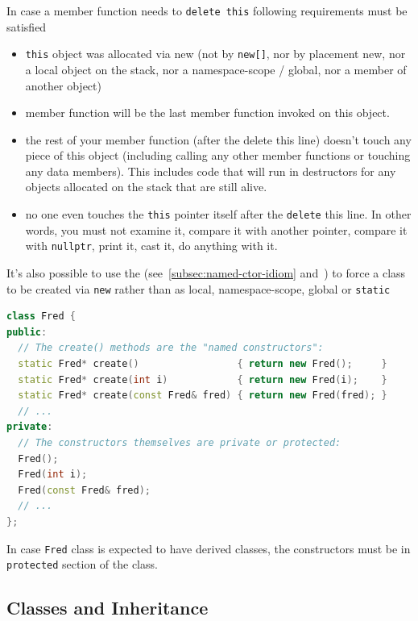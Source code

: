 In case a member function needs to \texttt{delete this} following 
requirements must be satisfied
\begin{itemize}
    \item \texttt{this} object was allocated via new (not by \texttt{new[]}, 
          nor by placement new, nor a local object on the stack, 
          nor a namespace-scope / global, nor a member of another 
          object)
    
    \item member function will be the last member function invoked on 
          this object.
    
    \item the rest of your member function (after the delete this line) 
          doesn’t touch any piece of this object (including calling any 
          other member functions or touching any data members). This 
          includes code that will run in destructors for any objects 
          allocated on the stack that are still alive.
    
    \item no one even touches the \texttt{this} pointer itself after the 
          \texttt{delete} this line. In other words, you must not examine 
          it, compare it with another pointer, compare it with \texttt{nullptr}, 
          print it, cast it, do anything with it.
    
\end{itemize}

It's also possible to use the  
(see~\ref{subsec:named-ctor-idiom} and~\cite{isocpp-named-ctor-idiom}) 
to force a class to be created via \texttt{new} rather than as local, 
namespace-scope, global or \texttt{static}
\begin{lstlisting}[language=C++]
class Fred {
public:
  // The create() methods are the "named constructors":
  static Fred* create()                 { return new Fred();     }
  static Fred* create(int i)            { return new Fred(i);    }
  static Fred* create(const Fred& fred) { return new Fred(fred); }
  // ...
private:
  // The constructors themselves are private or protected:
  Fred();
  Fred(int i);
  Fred(const Fred& fred);
  // ...
};
\end{lstlisting}
In case \texttt{Fred} class is expected to have derived classes, 
the constructors must be in 
\newline
\texttt{protected} section of the class.


\subsection{Classes and Inheritance}

